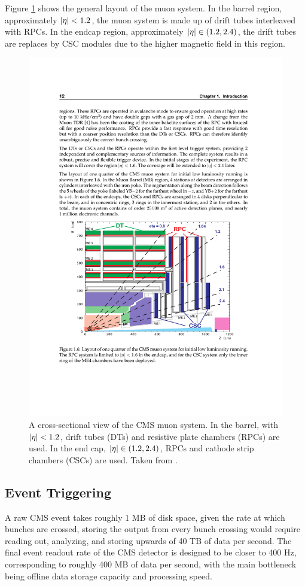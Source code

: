       Figure \ref{fig:muon_system} shows the general layout of the muon system. In the barrel region, approximately $\lvert \eta \rvert < 1.2$, the muon system is made up of drift tubes interleaved with RPCs. In the endcap region, approximately $\lvert \eta \rvert \in (1.2,2.4)$, the drift tubes are replaces by CSC modules due to the higher magnetic field in this region.

    \begin{figure}[h!]
      \centering
      \includegraphics[width=.9\textwidth]{figures/muon_system.pdf}
      \caption{A cross-sectional view of the CMS muon system. In the barrel, with $\lvert \eta \rvert<1.2$, drift tubes (DTs) and resistive plate chambers (RPCs) are used. In the end cap, $\lvert \eta \rvert \in (1.2,2.4)$, RPCs and cathode strip chambers (CSCs) are used. Taken from \cite{cms_tdr}.}
      \label{fig:muon_system}
    \end{figure}

  \subsection{Event Triggering} \label{sec:event_triggering}
    A raw CMS event takes roughly 1 MB of disk space, given the rate at which bunches are crossed, storing the output from every bunch crossing would require reading out, analyzing, and storing upwards of 40 TB of data per second.\cite{trigger_tdr} The final event readout rate of the CMS detector is designed to be closer to 400 Hz, corresponding to roughly 400 MB of data per second, with the main bottleneck being offline data storage capacity and processing speed.

